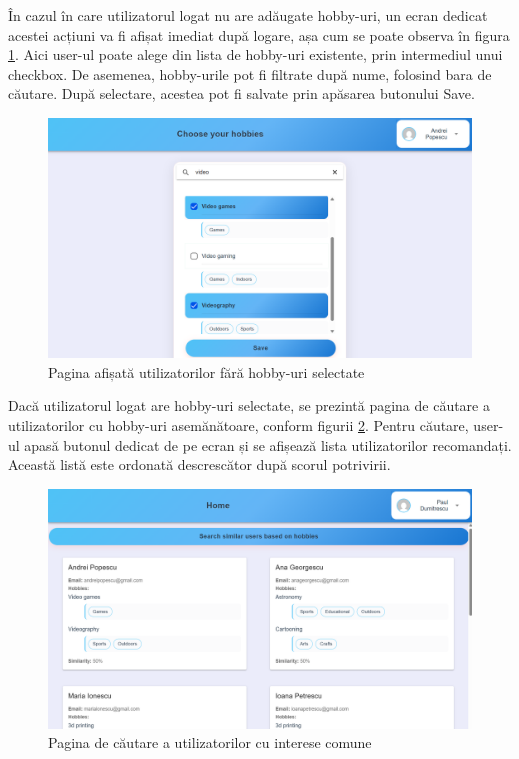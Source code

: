 \par
În cazul în care utilizatorul logat nu are adăugate hobby-uri, un ecran dedicat acestei acțiuni va fi afișat imediat după logare, așa cum se poate observa în figura \ref{FigOnboardingPage}.
Aici user-ul poate alege din lista de hobby-uri existente, prin intermediul unui checkbox. 
De asemenea, hobby-urile pot fi filtrate după nume, folosind bara de căutare.
După selectare, acestea pot fi salvate prin apăsarea butonului Save.

\begin{figure}[htbp]
	\centering
    \includegraphics[scale=0.35]{./figures/onboarding-page.png}
	\caption{Pagina afișată utilizatorilor fără hobby-uri selectate}
	\label{FigOnboardingPage}
\end{figure}

\par
Dacă utilizatorul logat are hobby-uri selectate, se prezintă pagina de căutare a utilizatorilor cu hobby-uri asemănătoare, conform figurii \ref{FigHomePage}.
Pentru căutare, user-ul apasă butonul dedicat de pe ecran și se afișează lista utilizatorilor recomandați.
Această listă este ordonată descrescător după scorul potrivirii.

\begin{figure}[htbp]
	\centering
    \includegraphics[scale=0.35]{./figures/home-page.png}
	\caption{Pagina de căutare a utilizatorilor cu interese comune}
	\label{FigHomePage}
\end{figure}

